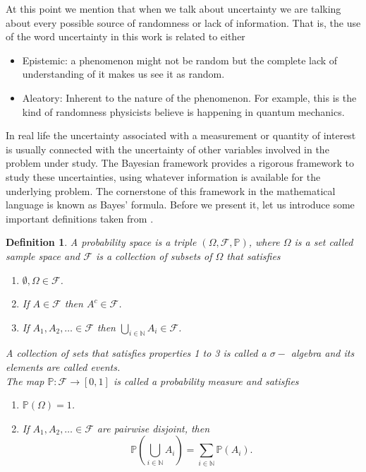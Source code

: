 \documentclass[12pt]{book}
\newtheorem{definition}{Definition}
\newcommand{\p}{\mathbb{P}}
\begin{document}
At this point we mention that when we talk about uncertainty we are talking about every possible 
source of randomness  or  lack of information. That is, the use of the word uncertainty in this work
is related to either \cite{kennedy2001bayesian}
\begin{itemize}
\item Epistemic: a phenomenon might not be random but the complete lack of 
understanding of it makes us see it as random.
\item Aleatory: Inherent to the nature of the phenomenon. For 
example, this is the kind of randomness physicists believe is happening in quantum mechanics.
\end{itemize}
In real life the uncertainty associated with a  measurement or  quantity 
of interest is usually connected  with the uncertainty  of other variables involved in the problem under study. 
The Bayesian framework provides a rigorous framework to study these uncertainties, 
using whatever information is available for the underlying problem. The cornerstone of this framework
in the mathematical language is known as   Bayes' formula. Before we present it, let us 
introduce some important definitions taken from \cite{dudley2002real}.

\begin{definition}\label{dfnprobabilitytriple}
A probability space is a triple $(\Omega,\mathscr{F},\p)$, where $\Omega$ is a set called 
sample space and $\mathscr{F}$ is a collection of subsets of $\Omega$ that satisfies
\begin{enumerate}
\item $\emptyset,\Omega\in\mathscr{F}$.
\item If $A\in\mathscr{F}$ then $A^{c}\in\mathscr{F}$.
\item If $A_{1},A_{2},\ldots \in\mathscr{F}$ then $\bigcup_{i\in\mathbb{N}}A_{i}\in\mathscr{F}$.
\end{enumerate}
A  collection of sets that satisfies properties 1 to 3 is called a $\sigma-$ algebra and its elements are called
events. 
\\
The map $\p:\mathscr{F}\rightarrow [0,1]$ is called a probability measure and satisfies
\begin{enumerate}
\item $\p(\Omega)=1$.
\item If $A_{1},A_{2},\ldots \in\mathscr{F}$ are pairwise disjoint, then 
\begin{equation*}
\p\left(\bigcup_{i\in\mathbb{N}}A_{i}\right)=\sum_{i\in\mathbb{N}}\p(A_{i}).
\end{equation*}
\end{enumerate}
\end{definition}
\end{document}
